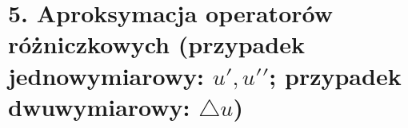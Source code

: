 \section{5. Aproksymacja operatorów różniczkowych (przypadek jednowymiarowy: ${u}', {{u}'}'$; przypadek dwuwymiarowy: $\bigtriangleup u$)}